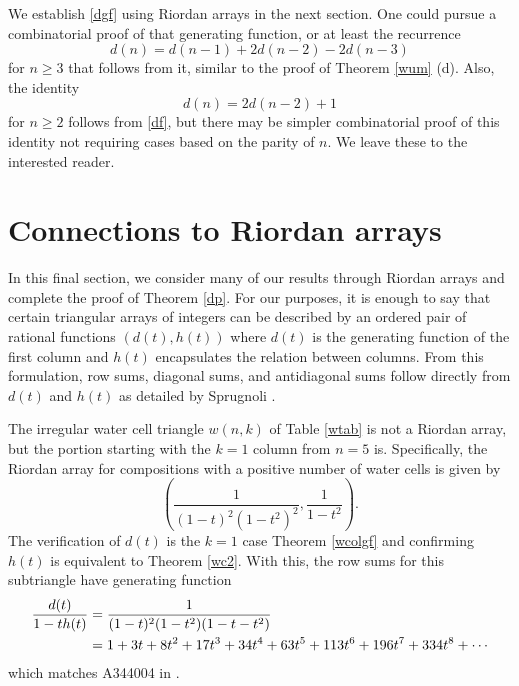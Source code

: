 \documentclass[]{interact}
\theoremstyle{plain}
\numberwithin{equation}{section} %
\numberwithin{table}{section} %
\numberwithin{figure}{section}
\begin{document}
We establish \eqref{dgf} using Riordan arrays in the next section.  One could pursue a combinatorial proof of that generating function, or at least the recurrence
\[d(n) = d(n-1) + 2d(n-2) - 2d(n-3)\]
for $n \ge 3$ that follows from it, similar to the proof of Theorem \ref{wum} (d).  Also, the identity \[d(n) = 2d(n-2)+1\] for $n \ge 2$ follows from \eqref{df}, but there may be simpler combinatorial proof of this identity not requiring cases based on the parity of $n$.  We leave these to the interested reader.


\section{Connections to Riordan arrays}


In this final section, we consider many of our results through Riordan arrays and complete the proof of Theorem \ref{dp}.
For our purposes, it is enough to say that certain triangular arrays of integers can be described by an ordered pair of rational functions $(d(t), h(t))$ where $d(t)$ is the generating function of the first column and $h(t)$ encapsulates the relation between columns.  From this formulation, row sums, diagonal sums, and antidiagonal sums follow directly from $d(t)$ and $h(t)$ as detailed by Sprugnoli \cite{s94}.

The irregular water cell triangle $w(n,k)$ of Table \ref{wtab} is not a Riordan array, but the portion starting with the $k=1$ column from $n=5$ is.  Specifically, the Riordan array for compositions with a positive number of water cells is given by
\begin{equation}
\left(\frac{1}{(1-t)^2(1-t^2)^2}, \frac{1}{1-t^2} \right)\!. \label{w1+}
 \end{equation}
The verification of $d(t)$ is the $k=1$ case Theorem \ref{wcolgf} and confirming $h(t)$ is equivalent to Theorem \ref{wc2}.  With this, the row sums for this subtriangle have generating function
\begin{align}
\frac{d(t)}{1-t h(t)} & = \frac{1}{(1 - t)^2 (1 - t^2) (1 - t - t^2)} \label{wrs} \\
& = 1 + 3 t + 8 t^2 + 17 t^3 + 34 t^4 + 63 t^5 + 113 t^6 + 196 t^7 + 334 t^8 + \cdots \notag %
\end{align}
which matches A344004 in \cite{o}.
\end{document}
